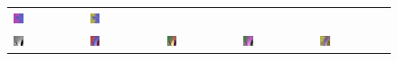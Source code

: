\begin{figure}[h!]
\begin{tabular}{C{0.19\textwidth}C{0.19\textwidth}C{0.19\textwidth}C{0.19\textwidth}C{0.19\textwidth}}
		\includegraphics[width=0.15\textwidth]{images/gen/activation_functions/p03_03.png_sigmoid.png} &
		\includegraphics[width=0.15\textwidth]{images/gen/activation_functions/p03_03.png_tanh.png} \\
		\includegraphics[width=0.15\textwidth]{images/p03/p03_04.png} &
		\includegraphics[width=0.15\textwidth]{images/gen/activation_functions/p03_04.png_None.png} &
		\includegraphics[width=0.15\textwidth]{images/gen/activation_functions/p03_04.png_relu.png} &
		\includegraphics[width=0.15\textwidth]{images/gen/activation_functions/p03_04.png_sigmoid.png} &
		\includegraphics[width=0.15\textwidth]{images/gen/activation_functions/p03_04.png_tanh.png} \\
		

\end{tabular}
\end{figure}
